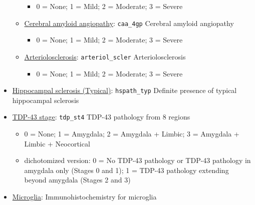 \documentclass[]{book}
\providecommand{\tightlist}{%
  \setlength{\itemsep}{0pt}\setlength{\parskip}{0pt}}
\begin{document}
\begin{itemize}
\begin{itemize}
    \begin{itemize}
    \tightlist
    \item
      0 = None; 1 = Mild; 2 = Moderate; 3 = Severe
    \end{itemize}
  \item
    \href{https://www.radc.rush.edu/docs/var/detail.htm?category=Pathology\&subcategory=Vascular+-+General+measures\&variable=caa_4gp}{Cerebral amyloid angiopathy}: \texttt{caa\_4gp} Cerebral amyloid angiopathy

    \begin{itemize}
    \tightlist
    \item
      0 = None; 1 = Mild; 2 = Moderate; 3 = Severe
    \end{itemize}
  \item
    \href{https://www.radc.rush.edu/docs/var/detail.htm?category=Pathology\&subcategory=Vascular+-+General+measures\&variable=arteriol_scler}{Arteriolosclerosis}: \texttt{arteriol\_scler} Arteriolosclerosis

    \begin{itemize}
    \tightlist
    \item
      0 = None; 1 = Mild; 2 = Moderate; 3 = Severe
    \end{itemize}
  \end{itemize}
\item
  \href{https://www.radc.rush.edu/docs/var/detail.htm?category=Pathology\&subcategory=Hippocampal+sclerosis\&variable=hspath_typ}{Hippocampal sclerosis (Typical)}: \texttt{hspath\_typ} Definite presence of typical hippocampal sclerosis
\item
  \href{https://www.radc.rush.edu/docs/var/detail.htm?category=Pathology\&subcategory=TDP-43\&variable=tdp_st4}{TDP-43 stage}: \texttt{tdp\_st4} TDP-43 pathology from 8 regions

  \begin{itemize}
  \tightlist
  \item
    0 = None; 1 = Amygdala; 2 = Amygdala + Limbic; 3 = Amygdala + Limbic + Neocortical
  \item
    dichotomized version: 0 = No TDP-43 pathology or TDP-43 pathology in amygdala only (Stages 0 and 1); 1 = TDP-43 pathology extending beyond amygdala (Stages 2 and 3)
  \end{itemize}
\item
  \href{https://www.radc.rush.edu/docs/var/overview.htm?category=Pathology\&subcategory=Microglia}{Microglia}: Immunohistochemistry for microglia


\end{itemize}
\end{document}
